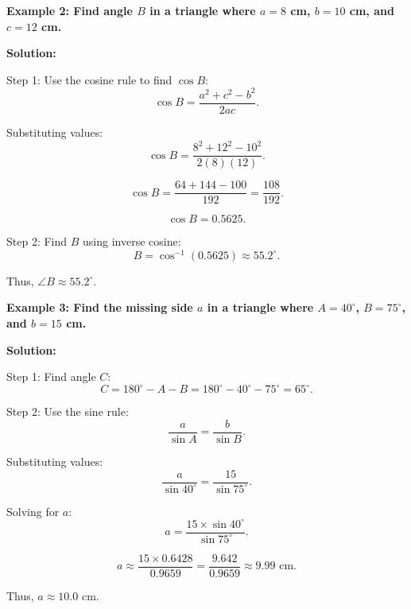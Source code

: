 \begin{flushleft}
	\textbf{Example 2: Find angle $B$ in a triangle where $a = 8$ cm, $b = 10$ cm, and $c = 12$ cm.}
	
	\vspace{0.5cm}
	\textbf{Solution:}
	\vspace{0.5cm}
	
	Step 1: Use the cosine rule to find $\cos B$:
	\[
	\cos B = \frac{a^2 + c^2 - b^2}{2ac}.
	\]
	
	Substituting values:
	\[
	\cos B = \frac{8^2 + 12^2 - 10^2}{2(8)(12)}.
	\]
	
	\[
	\cos B = \frac{64 + 144 - 100}{192} = \frac{108}{192}.
	\]
	
	\[
	\cos B = 0.5625.
	\]
	
	Step 2: Find $B$ using inverse cosine:
	\[
	B = \cos^{-1}(0.5625) \approx 55.2^\circ.
	\]
	
	Thus, $\angle B \approx 55.2^\circ$.
\end{flushleft}

\begin{flushleft}
	\textbf{Example 3: Find the missing side $a$ in a triangle where $A = 40^\circ$, $B = 75^\circ$, and $b = 15$ cm.}
	
	\vspace{0.5cm}
	\textbf{Solution:}
	\vspace{0.5cm}
	
	Step 1: Find angle $C$:
	\[
	C = 180^\circ - A - B = 180^\circ - 40^\circ - 75^\circ = 65^\circ.
	\]
	
	Step 2: Use the sine rule:
	\[
	\frac{a}{\sin A} = \frac{b}{\sin B}.
	\]
	
	Substituting values:
	\[
	\frac{a}{\sin 40^\circ} = \frac{15}{\sin 75^\circ}.
	\]
	
	Solving for $a$:
	\[
	a = \frac{15 \times \sin 40^\circ}{\sin 75^\circ}.
	\]
	
	\[
	a \approx \frac{15 \times 0.6428}{0.9659} = \frac{9.642}{0.9659} \approx 9.99 \text{ cm}.
	\]
	
	Thus, $a \approx 10.0$ cm.
\end{flushleft}
